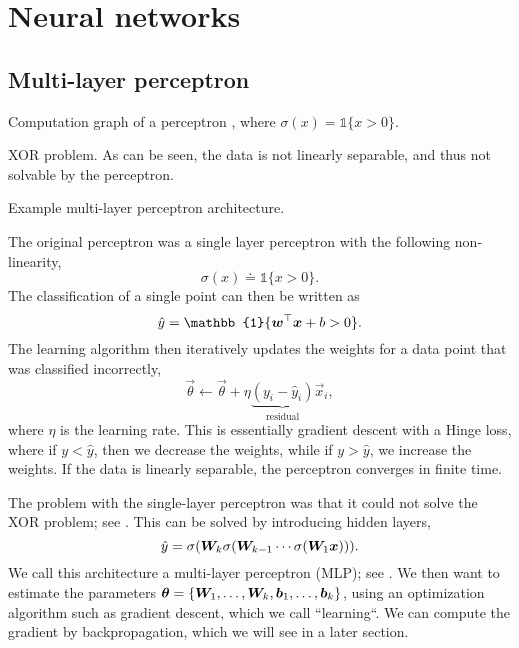 \section{Neural networks}

\subsection{Multi-layer perceptron}

\begin{marginfigure}
    \centering
    \caption{Computation graph of a perceptron \citep{rosenblatt1958perceptron}, where $\sigma(x) = \mathbb{1}\{ x > 0 \}$.}
    \label{fig:perceptron}
\end{marginfigure}

\begin{marginfigure}
    \centering
    \caption{XOR problem. As can be seen, the data is not linearly separable, and thus not solvable by the perceptron.}
    \label{fig:xor-problem}
\end{marginfigure}

\begin{marginfigure}
    \centering
    \caption{Example multi-layer perceptron architecture.}
    \label{fig:mlp}
\end{marginfigure}

The original perceptron \citep{rosenblatt1958perceptron} was a single layer perceptron with the
following non-linearity, \[
    \sigma(x) \doteq \mathbb{1}\{ x > 0 \}.
\]
The classification of a single point can then be written as \[
    \hat{y} = \mathbb{1}\{\transpose{\vec{w}}\vec{x} + b > 0\}.
\]
The learning algorithm then iteratively updates the weights for a data point that was classified
incorrectly, \[
    \vec{\theta} \gets \vec{\theta} + \eta \underbrace{(y_i - \hat{y}_i)}_{\text{residual}} \vec{x}_i,
\]
where $\eta$ is the learning rate. This is essentially gradient descent with a Hinge loss, where if
$y < \hat{y}$, then we decrease the weights, while if $y > \hat{y}$, we increase the weights. If
the data is linearly separable, the perceptron converges in finite time.

The problem with the single-layer perceptron was that it could not solve the XOR problem; see
. This can be solved by introducing hidden layers, \[
    \hat{y} = \sigma(\bm{W}_k \sigma(\bm{W}_{k-1} \cdots \sigma(\bm{W}_1 \bm{x}))).
\]
We call this architecture a multi-layer perceptron (MLP); see . We then want to
estimate the parameters $\bm{\theta} = \{ \bm{W}_1,\ldots,\bm{W}_k,\bm{b}_1,\ldots,\bm{b}_k
    \}$, using an optimization algorithm such as gradient descent, which we call ``learning``. We can
compute the gradient by backpropagation, which we will see in a later section.

